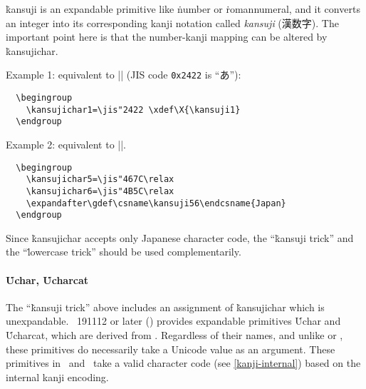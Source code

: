 \documentclass[a4paper,11pt,dvipdfmx]{article}
\let\emph=\origemph
\def\code#1{\texttt{#1}}
\def\Foreign#1{\textit{#1}}
\begin{document}
\.{kansuji} is an expandable primitive like \.{number} or \.{romannumeral},
and it converts an integer into its corresponding kanji notation
called \Foreign{kansuji} (漢数字). The important point here is that
the number-kanji mapping can be altered by \.{kansujichar}.

Example 1: equivalent to |\def\X{あ}| (JIS code \code{0x2422} is ``あ''):
\begin{verbatim}
  \begingroup
    \kansujichar1=\jis"2422 \xdef\X{\kansuji1}
  \endgroup
\end{verbatim}

Example 2: equivalent to |\def\日本{Japan}|.
\begin{verbatim}
  \begingroup
    \kansujichar5=\jis"467C\relax
    \kansujichar6=\jis"4B5C\relax
    \expandafter\gdef\csname\kansuji56\endcsname{Japan}
  \endgroup
\end{verbatim}

Since \.{kansujichar} accepts only Japanese character code,
the ``\.{kansuji} trick'' and the ``\.{lowercase} trick'' should be
used complementarily.

\paragraph{\.{Uchar}, \.{Ucharcat}}
The ``\.{kansuji} trick'' above includes an assignment of \.{kansujichar}
which is unexpandable.
\epTeX~191112 or later () provides expandable primitives
\.{Uchar} and \.{Ucharcat}, which are derived from .
Regardless of their names, and unlike  or ,
these primitives do \emph{not} necessarily take
a Unicode value as an argument.
These primitives in \epTeX\ and \eupTeX\ take a valid character code
(see \ref{kanji-internal}) based on the internal kanji encoding.
\end{document}

